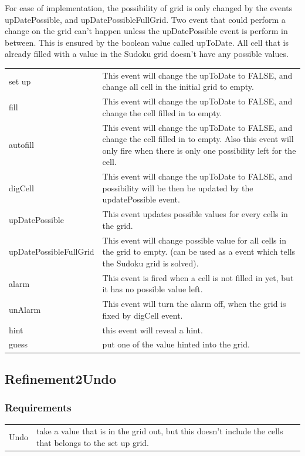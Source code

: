 \documentclass[a4paper]{article}
\begin{document}
\indent\indent For ease of implementation, the possibility of grid is only changed by the events upDatePossible, and upDatePossibleFullGrid.
\noindent Two event that could perform a change on the grid can't happen unless the upDatePossible event is perform in between. This is ensured by the boolean value called upToDate.
\noindent All cell that is already filled with a value in the Sudoku grid doesn't have any possible values.
\begin{center}
\begin{tabular}{|p{3.5cm}|p{10cm}|}
\hline
\color{blue}{Event} & \color{blue}{Usage}\\
\hline
set up & This event will change the upToDate to FALSE, and change all cell in the initial grid to empty.\\
\hline
fill & This event will change the upToDate to FALSE, and change the cell filled in to empty.\\
\hline
autofill & This event will change the upToDate to FALSE, and change the cell filled in to empty. Also this event will only fire when there is only one possibility left for the cell.\\
\hline
digCell & This event will change the upToDate to FALSE, and possibility will be then be updated by the updatePossible event.\\
\hline
upDatePossible & This event updates possible values for every cells in the grid.\\
\hline
upDatePossibleFullGrid & This event will change possible value for all cells in the grid to empty. (can be used as a event which tells the Sudoku grid is solved).\\
\hline
alarm & This event is fired when a cell is not filled in yet, but it has no possible value left.\\
\hline
unAlarm & This event will turn the alarm off, when the grid is fixed by digCell event.\\
\hline
hint & this event will reveal a hint.\\
\hline
guess & put one of the value hinted into the grid.\\
\hline
\end{tabular}
\end{center}

\subsection{Refinement2Undo}
\subsubsection{Requirements}
\begin{center}
\begin{tabular}{|p{3.5cm}|p{10cm}|}
\hline
\color{blue}{Requirements} & \color{blue}{Function}\\
\hline
Undo & take a value that is in the grid out, but this doesn't include the cells that belongs to the set up grid.\\
\hline
\end{tabular}
\end{center}
\end{document}
